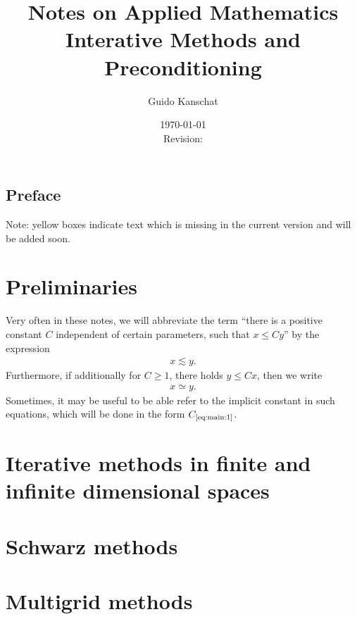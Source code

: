 \documentclass[USenglish]{report}
\title{\textbf{Notes on Applied Mathematics}
\\[5mm]
{\large Interative Methods and Preconditioning}}
\author{Guido Kanschat}
\date{\today\\[5mm]Revision: \svnrev}
\def\constref#1{C_{\text{\ref{#1}}}}
\begin{document}
\maketitle

\section*{Preface}

\thispagestyle{empty}
\begin{todo}
  Note: yellow boxes indicate text which is missing in the current
  version and will be added soon.
\end{todo}
\setcounter{page}{0}

\tableofcontents

\chapter{Preliminaries}

\begin{notation}
  Very often in these notes, we will abbreviate the term ``there is a
  positive constant $C$ independent of certain parameters, such that $x \le C
  y$'' by the expression
  \begin{gather}
    \label{eq:main:1}
    x \lesssim y.
  \end{gather}
  Furthermore, if additionally for $C\ge 1$, there holds  $y \le Cx$,
  then we write
  \begin{gather*}
    x \simeq y.
  \end{gather*}
  Sometimes, it may be useful to be able refer to the implicit
  constant in such equations, which will be done in the form  $\constref{eq:main:1}$.
\end{notation}



\chapter{Iterative methods in finite and infinite dimensional spaces}




\chapter{Schwarz methods}
\label{cha:iteration:schwarz-methods}


\chapter{Multigrid methods}
\label{cha:iteration:multigrid-methods}


\printbibliography
\printindex
\end{document}
